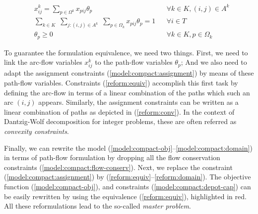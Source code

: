 \documentclass{article}
\begin{document}
\begin{align}
   & x^k_{ij} = \sum_{p \in \Omega^k} x_{pij} \theta_p & &  \forall k \in K, (i,j) \in A^k \label{reform:equiv}\\
   & \sum_{k \in K} \,\,\sum_{j:(i,j) \in A^k} \,\, \sum_{p \in \Omega_k} x_{pij} \theta_p = 1 & & \forall i \in T \label{reform:conv}\\
   & \theta_p \geqslant 0 & & \forall k \in K, p \in \Omega_k \label{reform:domain}
\end{align}

To guarantee the formulation equivalence, we need two things. First, we need to link the arc-flow variables $x^k_{ij}$ to the path-flow variables $\theta_p$; And we also need to adapt the assignment constraints (\ref{model:compact:assignment}) by means of these path-flow variables. Constraints (\ref{reform:equiv}) accomplish this first task by defining the arc-flow in terms of a linear combination of the paths which such an arc $(i,j)$ appears. Similarly, the assignment constraints can be written as a linear combination of paths as depicted in (\ref{reform:conv}). In the context of Dantzig-Wolf decomposition for integer problems, these are often referred as \textit{convexity constraints}.

Finally, we can rewrite the model (\ref{model:compact-obj}--\ref{model:compact:domain}) in terms of path-flow formulation by dropping all the flow conservation constraints (\ref{model:compact:flow-conserv}). Next, we replace the constraint (\ref{model:compact:assignment}) by (\ref{reform:equiv}--\ref{reform:domain}). The objective function (\ref{model:compact-obj}), and constraints (\ref{model:compact:depot-cap}) can be easily rewritten by using the equivalence (\ref{reform:equiv}), highlighted in red. All these reformulations lead to the so-called \textit{master problem}.
\end{document}

